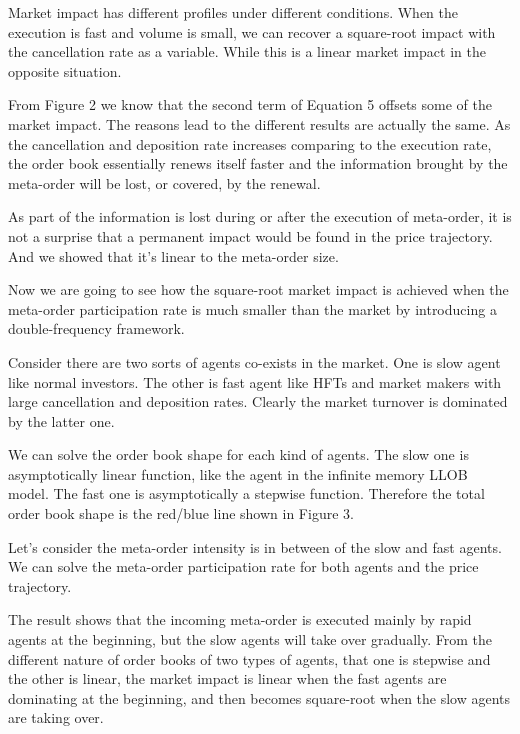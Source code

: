 \documentclass{article}
\begin{document}
Market impact has different profiles under different conditions. When the execution is fast and volume is small, we can recover a square-root impact with the cancellation rate as a variable. While this is a linear market impact in the opposite situation. \newline

From Figure 2 we know that the second term of Equation 5 offsets some of the market impact. The reasons lead to the different results are actually the same. As the cancellation and deposition rate increases comparing to the execution rate, the order book essentially renews itself faster and the information brought by the meta-order will be lost, or covered, by the renewal. \newline

As part of the information is lost during or after the execution of meta-order, it is not a surprise that a permanent impact would be found in the price trajectory. And we showed that it's linear to the meta-order size. \newline

Now we are going to see how the square-root market impact is achieved when the meta-order participation rate is much smaller than the market by introducing a double-frequency framework. \newline

Consider there are two sorts of agents co-exists in the market. One is slow agent like normal investors. The other is fast agent like HFTs and market makers with large cancellation and deposition rates. Clearly the market turnover is dominated by the latter one. \newline

We can solve the order book shape for each kind of agents. The slow one is asymptotically linear function, like the agent in the infinite memory LLOB model. The fast one is asymptotically a stepwise function. Therefore the total order book shape is the red/blue line shown in Figure 3. \newline

Let's consider the meta-order intensity is in between of the slow and fast agents. We can solve the meta-order participation rate for both agents and the price trajectory. \newline

The result shows that the incoming meta-order is executed mainly by rapid agents at the beginning, but the slow agents will take over gradually. From the different nature of order books of two types of agents, that one is stepwise and the other is linear, the market impact is linear when the fast agents are dominating at the beginning, and then becomes square-root when the slow agents are taking over. \newline
\end{document}
